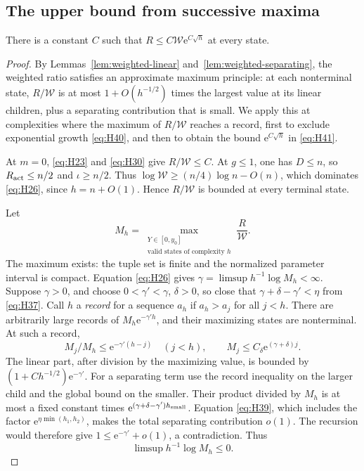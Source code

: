 \subsection{The upper bound from successive maxima}\label{terminal-upper-bounds-and-the-two-record-arguments}

\begin{lemma}\label{lem:upper}
There is a constant \(C\) such that \(R\le C\mathcal W\mathrm e^{C\sqrt h}\)
at every state.
\end{lemma}

\begin{proof}
By Lemmas~\ref{lem:weighted-linear} and~\ref{lem:weighted-separating}, the weighted ratio satisfies an
approximate maximum principle: at each nonterminal state, \(R/\mathcal W\)
is at most \(1+O(h^{-1/2})\) times the largest value at its linear
children, plus a separating contribution that is small. We apply this at
complexities where the maximum of \(R/\mathcal W\) reaches a record, first
to exclude exponential growth \eqref{eq:H40}, and then to obtain the bound
\(\mathrm e^{C\sqrt h}\) in \eqref{eq:H41}.

At \(m=0\), \eqref{eq:H23} and \eqref{eq:H30} give \(R/\mathcal W\le C\). At \(g\le1\),
one has \(D\le n\), so \(R_{\rm act}\le n/2\) and \(\iota\ge n/2\). Thus
\(\log\mathcal W\ge(n/4)\log n-O(n)\), which dominates \eqref{eq:H26}, since
\(h=n+O(1)\). Hence \(R/\mathcal W\) is bounded at every terminal state.

Let \[
M_h=\max_{\substack{Y\in[0,y_0]\\\text{valid states of complexity }h}}
\frac{R}{\mathcal W}.
\] The maximum exists: the tuple set is finite and the normalized
parameter interval is compact. Equation \eqref{eq:H26} gives
\(\gamma=\limsup h^{-1}\log M_h<\infty\). Suppose \(\gamma>0\), and
choose \(0<\gamma'<\gamma\), \(\delta>0\), so close that
\(\gamma+\delta-\gamma'<\eta\) from \eqref{eq:H37}. Call \(h\) a \emph{record} for a sequence \(a_h\) if \(a_h>a_j\) for all \(j<h\). There are arbitrarily large
records of \(M_h\mathrm{e}^{-\gamma'h}\), and their maximizing states are
nonterminal. At such a record, \[
M_j/M_h\le \mathrm{e}^{-\gamma'(h-j)}\quad(j<h),\qquad
M_j\le C_\delta \mathrm{e}^{(\gamma+\delta)j}.
\] The linear part, after division by the maximizing value, is bounded
by \((1+Ch^{-1/2})\mathrm{e}^{-\gamma'}\). For a separating term use the record
inequality on the larger child and the global bound on the smaller.
Their product divided by \(M_h\) is at most a fixed constant times
\(\mathrm{e}^{(\gamma+\delta-\gamma')h_{\rm small}}\). Equation \eqref{eq:H39}, which includes the factor
\(\mathrm e^{\eta\min(h_1,h_2)}\), makes the total separating contribution \(o(1)\). The recursion
would therefore give \(1\le \mathrm{e}^{-\gamma'}+o(1)\), a contradiction. Thus
\begin{equation}
\limsup h^{-1}\log M_h\le0.
\label{eq:H40}
\end{equation}


\end{proof}
